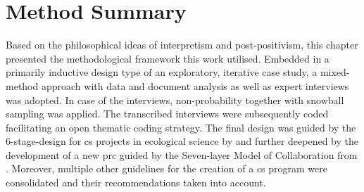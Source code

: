 
\section{Method Summary}

Based on the philosophical ideas of interpretism and post-positivism, this chapter presented the methodological framework this work utilised. Embedded in a primarily inductive design type of an exploratory, iterative case study, a mixed-method approach with data and document analysis as well as expert interviews was adopted. In case of the interviews, non-probability together with snowball sampling was applied. The transcribed interviews were subsequently coded facilitating an open thematic coding strategy. The final design was guided by the 6-stage-design for \acrlong{cs} projects in ecological science by \autocite{fraislCitizenScienceEnvironmental2022} and further deepened by the development of a new \acrlong{prc} guided by the Seven-layer Model of Collaboration from \autocite{briggsSevenLayerModelCollaboration2009}. Moreover, multiple other guidelines for the creation of a \acrshort{cs} program were consolidated and their recommendations taken into account.\newline




